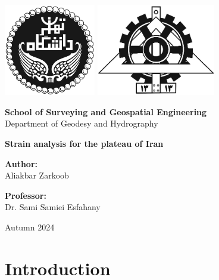 \documentclass[12pt]{article}
\begin{document}
	
	\begin{titlepage}
		\begin{center}
			
			\includegraphics[height=4cm]{University_of_Tehran_Transparent_BW_logo.png} \hfill
			\includegraphics[height=4cm]{Fanni_Alt_BW_Logo.png}
			
			\vspace{1cm}
			
			\Large \textbf{School of Surveying and Geospatial Engineering}\\
			\large {Department of Geodesy and Hydrography}
			
			\vspace{3cm}
			
			\huge \textbf{Strain analysis for the plateau of Iran} \\
			\large \href{https://github.com/XIVAliakbarZarkoob/Strain-Analysis}{\faGithub}
			
			\vspace{2cm}
			
			\Large \textbf{Author:}\\
			\Large Aliakbar Zarkoob
			
			\vspace{2cm}
			
			\Large \textbf{Professor:}\\
			Dr. Sami Samiei Esfahany
			
			\vfill
			
			\large {Autumn 2024}
			
		\end{center}
	\end{titlepage}
	
	
	\section{Introduction}
	
\end{document}
